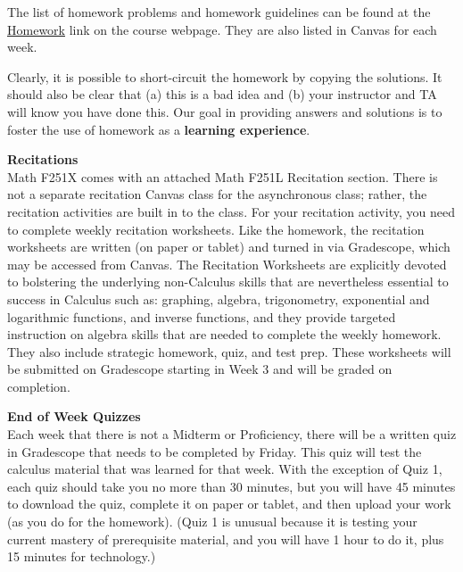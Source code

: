 \documentclass[12pt]{article}
\renewcommand{\emph}[1]{\textsf{\textbf{#1}}}
\newcommand{\localhead}[1]{\par\smallskip\textbf{#1}\nobreak\\}%
\def\heading#1{\localhead{\large\emph{#1}}}
\begin{document}
The list of homework problems and homework guidelines can be found at the \href{https://uaf-math251.github.io/writtenhomework.html}{Homework} link on the course webpage. They are also listed in Canvas for each week.

Clearly, it is possible to short-circuit the homework by copying the solutions. It should also be clear that (a) this is a bad idea and (b) your instructor and TA will know you have done this. Our goal in providing answers and solutions is to foster the use of homework as a \emph{learning experience}. 

\heading{Recitations}
%
Math F251X comes with an attached Math F251L Recitation section. There is not a separate recitation Canvas class for the asynchronous class; rather, the recitation activities are built in to the class. For your recitation activity, you need to complete weekly recitation worksheets. Like the homework, the recitation worksheets are written (on paper or tablet) and turned in via Gradescope, which may be accessed from Canvas. The Recitation Worksheets are explicitly devoted to bolstering the underlying non-Calculus skills that are nevertheless essential to success in Calculus such as: graphing, algebra, trigonometry, exponential and logarithmic functions, and inverse functions, and they provide targeted instruction on algebra skills that are needed to complete the weekly homework. They also include strategic homework, quiz, and test prep. These worksheets will be submitted on Gradescope starting in Week 3 and will be graded on completion.




\heading{End of Week Quizzes}
Each week that there is not a Midterm or Proficiency, there will be a written quiz in Gradescope that needs to be completed by Friday. This quiz will test
the calculus material that was learned for that week. With the exception of Quiz 1, each quiz should take you no more than 30 minutes, but you will have 45 minutes to download the quiz, complete it on paper or tablet, and then upload your work (as you do for the homework). (Quiz 1 is unusual because it is testing your current mastery of prerequisite material, and you will have 1 hour to do it, plus 15 minutes for technology.)
\end{document}
